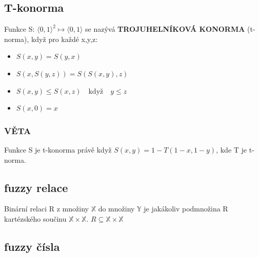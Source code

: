 \documentclass[a4]{report}
\theoremstyle{definition}
\begin{document}
{\subsection{T-konorma}
Funkce S: $\langle0,1\rangle^2\mapsto\langle0,1\rangle$ se nazývá \textbf{TROJUHELNÍKOVÁ KONORMA} (t-norma), když pro každé x,y,z: 

\begin{itemize}
\item $S(x,y)=S(y,x)$
\item $S(x,S(y,z))=S(S(x,y),z)$
\item $S(x,y) \leq S(x,z)\quad \text{když} \quad y\leq z$
\item $S(x,0)=x$
\end{itemize}

\subsubsection{VĚTA}
Funkce S je t-konorma právě když 
$S(x,y)=1-T(1-x,1-y)$, kde T je t-norma.
\subsection{fuzzy relace}
Binární relaci R z množiny $\mathbb{X}$ do množiny $\mathbb{Y}$ je jakákoliv podmnožina R kartézského součinu $\mathbb{X}\times\mathbb{X}$. $R\subseteq\mathbb{X}\times\mathbb{X}$
\subsection{fuzzy čísla}
}
\end{document}
